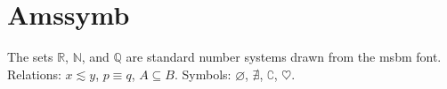 \documentclass{article}
\begin{document}
\section{Amssymb}
The sets $\mathbb{R}$, $\mathbb{N}$, and $\mathbb{Q}$ are standard
number systems drawn from the msbm font.
Relations: $x \lesssim y$, $p \equiv q$, $A \subseteq B$.
Symbols: $\varnothing$, $\nexists$, $\complement$, $\heartsuit$.
\end{document}
